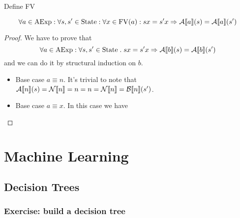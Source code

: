\documentclass[12pt,a4paper,oneside]{book}
\begin{document}
\begin{definition}
    \label{ex_1_12_fv}
    Define FV 
\end{definition}

\begin{lemma}
    \label{ex_1_12_lemma}
    \[
    \forall a \in \mathrm{AExp} \mathrel{:} \forall s, s' \in \mathrm{State} \mathrel{:} \forall x \in \mathrm{FV}(a) \mathrel{:} sx = s'x \Rightarrow \mathcal{A} \llbracket a \rrbracket (s) = \mathcal{A} \llbracket a \rrbracket (s')
    \]
    
    \begin{proof}
        We have to prove that
        \[
        \forall a \in \mathrm{AExp} \mathrel{:} \forall s, s' \in \mathrm{State} \mathrel{.} sx = s'x \Rightarrow \mathcal{A} \llbracket b \rrbracket (s) = \mathcal{A} \llbracket b \rrbracket (s')
        \]
        and we can do it by structural induction on $b$.
        
        \begin{itemize}
            \item Base case $a \equiv n$. It's trivial to note that $\mathcal{A} \llbracket n \rrbracket (s) = \mathcal{N} \llbracket n \rrbracket = n = n = \mathcal{N} \llbracket n \rrbracket = \mathcal{B} \llbracket n \rrbracket (s')$.
            \item Base case $a \equiv x$. In this case we have
        \end{itemize}
    \end{proof}
\end{lemma}

\chapter{Machine Learning}

\section{Decision Trees}

\subsection{Exercise: build a decision tree}
\end{document}
